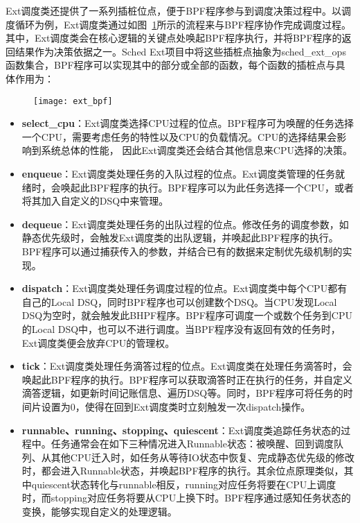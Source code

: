 Ext调度类还提供了一系列插桩位点，便于BPF程序参与到调度决策过程中。以调度循环为例，Ext调度类通过如图~\ref{fig:ext_bpf}所示的流程来与BPF程序协作完成调度过程。其中，Ext调度类会在核心逻辑的关键点处唤起BPF程序执行，并将BPF程序的返回结果作为决策依据之一。Sched Ext项目中将这些插桩点抽象为sched\_ext\_ops函数集合，BPF程序可以实现其中的部分或全部的函数，每个函数的插桩点与具体作用为：

\begin{figure}[!htbp]
    \centering
    \texttt{[image: ext\_bpf]}
    \label{fig:ext_bpf}
\end{figure}

\begin{itemize}

    \item \textbf{select\_cpu}：Ext调度类选择CPU过程的位点。BPF程序可为唤醒的任务选择一个CPU，需要考虑任务的特性以及CPU的负载情况。CPU的选择结果会影响到系统总体的性能，
    因此Ext调度类还会结合其他信息来CPU选择的决策。

    \item \textbf{enqueue}：Ext调度类处理任务的入队过程的位点。Ext调度类管理的任务就绪时，会唤起此BPF程序的执行。BPF程序可以为此任务选择一个CPU，或者将其加入自定义的DSQ中来管理。

    \item \textbf{dequeue}：Ext调度类处理任务的出队过程的位点。修改任务的调度参数，如静态优先级时，会触发Ext调度类的出队逻辑，并唤起此BPF程序的执行。BPF程序可以通过捕获传入的参数，并结合已有的数据来定制优先级机制的实现。
    
    \item \textbf{dispatch}：Ext调度类处理任务调度过程的位点。Ext调度类中每个CPU都有自己的Local DSQ，同时BPF程序也可以创建数个DSQ。当CPU发现Local DSQ为空时，就会触发此BHPF程序。BPF程序可调度一个或数个任务到CPU的Local DSQ中，也可以不进行调度。当BPF程序没有返回有效的任务时，Ext调度类便会放弃CPU的管理权。
    
    \item \textbf{tick}：Ext调度类处理任务滴答过程的位点。Ext调度类在处理任务滴答时，会唤起此BPF程序的执行。BPF程序可以获取滴答时正在执行的任务，并自定义滴答逻辑，如更新时间记账信息、遍历DSQ等。同时，BPF程序可将任务的时间片设置为0，使得在回到Ext调度类时立刻触发一次dispatch操作。

    \item \textbf{runnable、running、stopping、quiescent}：Ext调度类追踪任务状态的过程中。任务通常会在如下三种情况进入Runnable状态：被唤醒、回到调度队列、从其他CPU迁入时，如任务从等待IO状态中恢复、完成静态优先级的修改时，都会进入Runnable状态，并唤起BPF程序的执行。其余位点原理类似，其中quiescent状态转化与runnable相反，running对应任务将要在CPU上调度时，而stopping对应任务将要从CPU上换下时。BPF程序通过感知任务状态的变换，能够实现自定义的处理逻辑。
    

\end{itemize}

